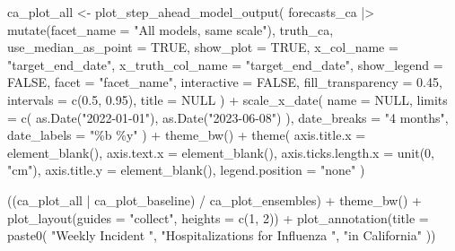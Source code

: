 \documentclass[
]{article}
\newenvironment{Shaded}{\begin{snugshade}}{\end{snugshade}}
\newcommand{\AttributeTok}[1]{\textcolor[rgb]{0.40,0.45,0.13}{#1}}
\newcommand{\ConstantTok}[1]{\textcolor[rgb]{0.56,0.35,0.01}{#1}}
\newcommand{\DecValTok}[1]{\textcolor[rgb]{0.68,0.00,0.00}{#1}}
\newcommand{\FloatTok}[1]{\textcolor[rgb]{0.68,0.00,0.00}{#1}}
\newcommand{\FunctionTok}[1]{\textcolor[rgb]{0.28,0.35,0.67}{#1}}
\newcommand{\NormalTok}[1]{\textcolor[rgb]{0.00,0.23,0.31}{#1}}
\newcommand{\OtherTok}[1]{\textcolor[rgb]{0.00,0.23,0.31}{#1}}
\newcommand{\SpecialCharTok}[1]{\textcolor[rgb]{0.37,0.37,0.37}{#1}}
\newcommand{\StringTok}[1]{\textcolor[rgb]{0.13,0.47,0.30}{#1}}
\begin{document}
\begin{Shaded}
\begin{Highlighting}[]
\NormalTok{ca\_plot\_all }\OtherTok{\textless{}{-}}
  \FunctionTok{plot\_step\_ahead\_model\_output}\NormalTok{(}
\NormalTok{    forecasts\_ca }\SpecialCharTok{|\textgreater{}} \FunctionTok{mutate}\NormalTok{(}\AttributeTok{facet\_name =} \StringTok{"All models, same scale"}\NormalTok{),}
\NormalTok{    truth\_ca,}
    \AttributeTok{use\_median\_as\_point =} \ConstantTok{TRUE}\NormalTok{,}
    \AttributeTok{show\_plot =} \ConstantTok{TRUE}\NormalTok{,}
    \AttributeTok{x\_col\_name =} \StringTok{"target\_end\_date"}\NormalTok{,}
    \AttributeTok{x\_truth\_col\_name =} \StringTok{"target\_end\_date"}\NormalTok{,}
    \AttributeTok{show\_legend =} \ConstantTok{FALSE}\NormalTok{,}
    \AttributeTok{facet =} \StringTok{"facet\_name"}\NormalTok{,}
    \AttributeTok{interactive =} \ConstantTok{FALSE}\NormalTok{,}
    \AttributeTok{fill\_transparency =} \FloatTok{0.45}\NormalTok{,}
    \AttributeTok{intervals =} \FunctionTok{c}\NormalTok{(}\FloatTok{0.5}\NormalTok{, }\FloatTok{0.95}\NormalTok{),}
    \AttributeTok{title =} \ConstantTok{NULL}
\NormalTok{  ) }\SpecialCharTok{+}
  \FunctionTok{scale\_x\_date}\NormalTok{(}
    \AttributeTok{name =} \ConstantTok{NULL}\NormalTok{, }\AttributeTok{limits =} \FunctionTok{c}\NormalTok{(}
      \FunctionTok{as.Date}\NormalTok{(}\StringTok{"2022{-}01{-}01"}\NormalTok{),}
      \FunctionTok{as.Date}\NormalTok{(}\StringTok{"2023{-}06{-}08"}\NormalTok{)}
\NormalTok{    ),}
    \AttributeTok{date\_breaks =} \StringTok{"4 months"}\NormalTok{, }\AttributeTok{date\_labels =} \StringTok{"\%b \textquotesingle{}\%y"}
\NormalTok{  ) }\SpecialCharTok{+}
  \FunctionTok{theme\_bw}\NormalTok{() }\SpecialCharTok{+}
  \FunctionTok{theme}\NormalTok{(}
    \AttributeTok{axis.title.x =} \FunctionTok{element\_blank}\NormalTok{(),}
    \AttributeTok{axis.text.x =} \FunctionTok{element\_blank}\NormalTok{(),}
    \AttributeTok{axis.ticks.length.x =} \FunctionTok{unit}\NormalTok{(}\DecValTok{0}\NormalTok{, }\StringTok{"cm"}\NormalTok{),}
    \AttributeTok{axis.title.y =} \FunctionTok{element\_blank}\NormalTok{(),}
    \AttributeTok{legend.position =} \StringTok{"none"}
\NormalTok{  )}

\NormalTok{((ca\_plot\_all }\SpecialCharTok{|}\NormalTok{ ca\_plot\_baseline) }\SpecialCharTok{/}\NormalTok{ ca\_plot\_ensembles) }\SpecialCharTok{+}
  \FunctionTok{theme\_bw}\NormalTok{() }\SpecialCharTok{+}
  \FunctionTok{plot\_layout}\NormalTok{(}\AttributeTok{guides =} \StringTok{"collect"}\NormalTok{, }\AttributeTok{heights =} \FunctionTok{c}\NormalTok{(}\DecValTok{1}\NormalTok{, }\DecValTok{2}\NormalTok{)) }\SpecialCharTok{+}
  \FunctionTok{plot\_annotation}\NormalTok{(}\AttributeTok{title =} \FunctionTok{paste0}\NormalTok{(}
    \StringTok{"Weekly Incident "}\NormalTok{,}
    \StringTok{"Hospitalizations for Influenza "}\NormalTok{,}
    \StringTok{"in California"}
\NormalTok{  ))}
\end{Highlighting}
\end{Shaded}
\end{document}
